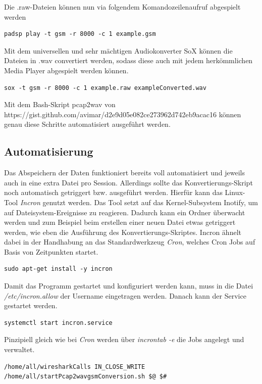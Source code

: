 Die .raw-Dateien können nun via folgendem Komandozeilenaufruf abgespielt werden
\begin{lstlisting}
padsp play -t gsm -r 8000 -c 1 example.gsm
\end{lstlisting}

Mit dem universellen und sehr mächtigen Audiokonverter SoX können die Dateien in .wav convertiert werden, sodass diese auch mit jedem herkömmlichen Media Player abgespielt werden können.
\begin{lstlisting}
sox -t gsm -r 8000 -c 1 example.raw exampleConverted.wav
\end{lstlisting}

Mit dem Bash-Skript pcap2wav von https://gist.github.com/avimar/d2e9d05e082ce273962d742eb9acac16 können genau diese Schritte automatisiert ausgeführt werden.


\subsection{Automatisierung}\label{automatisierung}

Das Abspeichern der Daten funktioniert bereits voll automatisiert und jeweils auch in eine extra Datei pro Session. Allerdings sollte das Konvertierungs-Skript noch automatisch getriggert bzw. ausgeführt werden. Hierfür kann das Linux-Tool \textit{Incron} genutzt werden. Das Tool setzt auf das Kernel-Subsystem Inotify, um auf Dateisystem-Ereignisse zu reagieren. Dadurch kann ein Ordner überwacht werden und zum Beispiel beim erstellen einer neuen Datei etwas getriggert werden, wie eben die Ausführung des Konvertierungs-Skriptes. Incron ähnelt dabei in der Handhabung an das Standardwerkzeug \textit{Cron}, welches Cron Jobs auf Basis von Zeitpunkten startet.


\begin{lstlisting}
sudo apt-get install -y incron
\end{lstlisting}

Damit das Programm gestartet und konfiguriert werden kann, muss in die Datei \textit{/etc/incron.allow} der Username eingetragen werden. Danach kann der Service gestartet werden.

\begin{lstlisting}
systemctl start incron.service
\end{lstlisting}

Pinzipiell gleich wie bei \textit{Cron} werden über \textit{incrontab -e} die Jobs angelegt und verwaltet.
\begin{lstlisting}
/home/all/wiresharkCalls IN_CLOSE_WRITE /home/all/startPcap2wavgsmConversion.sh $@ $#
\end{lstlisting}


